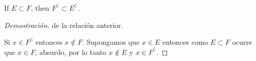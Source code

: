 \item If $E \subset F$, then $F^\complement  \subset E^\complement $.

\begin{proof}[Demostración] de la relación anterior.

    Si $x \in F^\complement $ entonces $x \not \in F$. Supongamos que $x \in E$ entonces como $E \subset F$ ocurre que $x \in F$, absurdo, por lo tanto $x \not \in E$ y $x \in F^\complement$.
\end{proof}